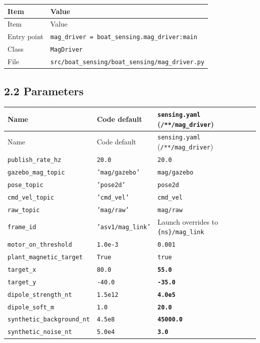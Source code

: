 \begin{center}
\small
\begin{longtable}{@{}lp{10cm}@{}}
\toprule
Item & Value \\
\midrule
\endfirsthead
\toprule
Item & Value \\
\midrule
\endhead
Entry point & \texttt{mag\_driver = boat\_sensing.mag\_driver:main} \\
Class & \texttt{MagDriver} \\
File & \texttt{src/boat\_sensing/boat\_sensing/mag\_driver.py} \\
\bottomrule
\end{longtable}
\end{center}


\subsection{2.2 Parameters}


\begin{center}
\small
\begin{longtable}{@{}llp{7.2cm}@{}}
\toprule
Name & Code default & \texttt{sensing.yaml} (\texttt{/**/mag\_driver}) \\
\midrule
\endfirsthead
\toprule
Name & Code default & \texttt{sensing.yaml} (\texttt{/**/mag\_driver}) \\
\midrule
\endhead
\texttt{publish\_rate\_hz} & \texttt{20.0} & \texttt{20.0} \\
\texttt{gazebo\_mag\_topic} & \texttt{'mag/gazebo'} & \texttt{mag/gazebo} \\
\texttt{pose\_topic} & \texttt{'pose2d'} & \texttt{pose2d} \\
\texttt{cmd\_vel\_topic} & \texttt{'cmd\_vel'} & \texttt{cmd\_vel} \\
\texttt{raw\_topic} & \texttt{'mag/raw'} & \texttt{mag/raw} \\
\texttt{frame\_id} & \texttt{'asv1/mag\_link'} & Launch overrides to \texttt{\{ns\}/mag\_link} \\
\texttt{motor\_on\_threshold} & \texttt{1.0e-3} & \texttt{0.001} \\
\texttt{plant\_magnetic\_target} & \texttt{True} & \texttt{true} \\
\texttt{target\_x} & \texttt{80.0} & \textbf{\texttt{55.0}} \\
\texttt{target\_y} & \texttt{-40.0} & \textbf{\texttt{-35.0}} \\
\texttt{dipole\_strength\_nt} & \texttt{1.5e12} & \textbf{\texttt{4.0e5}} \\
\texttt{dipole\_soft\_m} & \texttt{1.0} & \textbf{\texttt{20.0}} \\
\texttt{synthetic\_background\_nt} & \texttt{4.5e8} & \textbf{\texttt{45000.0}} \\
\texttt{synthetic\_noise\_nt} & \texttt{5.0e4} & \textbf{\texttt{3.0}} \\
\bottomrule
\end{longtable}
\end{center}



